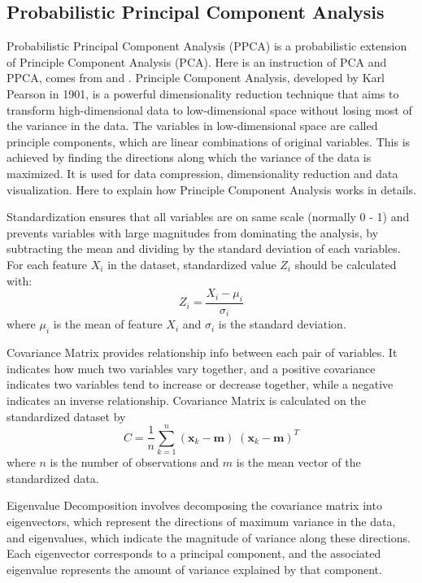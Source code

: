 \documentclass[12pt,a4paper,english
]{tunithesis}
\begin{document}
\subsection{Probabilistic Principal Component Analysis}
Probabilistic Principal Component Analysis (PPCA) is a probabilistic extension of Principle Component Analysis (PCA). Here is an instruction of PCA and PPCA, comes from \textcite{lindsay2002} and \textcite{tipping2002}.
Principle Component Analysis, developed by Karl Pearson in 1901, is a powerful dimensionality reduction technique that aims to transform high-dimensional data to low-dimensional space without losing most of the variance in the data. \parencite{mackiewicz1993} The variables in low-dimensional space are called principle components, which are linear combinations of original variables. This is achieved by finding the directions along which the variance of the data is maximized. It is used for data compression, dimensionality reduction and data visualization. Here to explain how Principle Component Analysis works in details.

Standardization ensures that all variables are on same scale (normally 0 - 1) and prevents variables with large magnitudes from dominating the analysis, by subtracting the mean and dividing by the standard deviation of each variables. For each feature $X_i$ in the dataset, standardized value $Z_i$ should be calculated with: %
\begin{equation}
    \label{eq:ppca_standardized_value}
    {Z_i} = {\frac {{X_i}-{\mu_i}}{\sigma_i}}
\end{equation}
where $\mu_i$ is the mean of feature $X_i$ and $\sigma_i$ is the standard deviation.

Covariance Matrix provides relationship info between each pair of variables. It indicates how much two variables vary together, and a positive covariance indicates two variables tend to increase or decrease together, while a negative indicates an inverse relationship. Covariance Matrix is calculated on the standardized dataset by 
\begin{equation}
    C = \frac{1}{n}\sum\limits_{k=1}^n (\pmb x_k - \pmb m)\;(\pmb x_k - \pmb m)^T
\end{equation}
where $n$ is the number of observations and $m$ is the mean vector of the standardized data.

Eigenvalue Decomposition involves decomposing the covariance matrix into eigenvectors, which represent the directions of maximum variance in the data, and eigenvalues, which indicate the magnitude of variance along these directions. Each eigenvector corresponds to a principal component, and the associated eigenvalue represents the amount of variance explained by that component.
\end{document}
